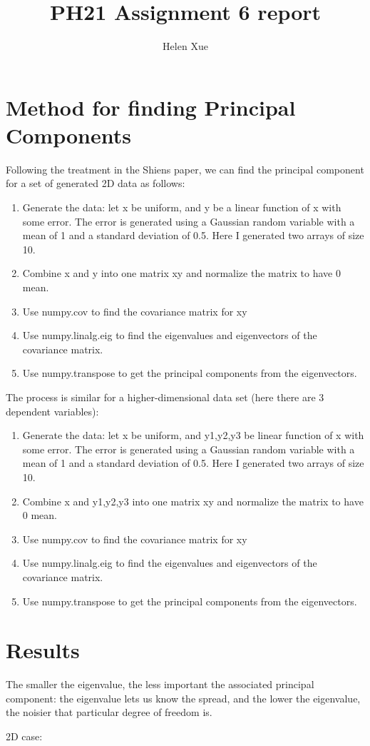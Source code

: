 \documentclass[]{scrartcl}
\title{PH21 Assignment 6 report}
\author{Helen Xue}
\begin{document}
\maketitle

\section{Method for finding Principal Components}
\par Following the treatment in the Shiens paper, we can find the principal component for a set of generated 2D data as follows:
\begin{enumerate}
	\item Generate the data: let x be uniform, and y be a linear function of x with some error. The error is generated using a Gaussian random variable with a mean of 1 and a standard deviation of 0.5. Here I generated two arrays of size 10.
	\item Combine x and y into one matrix xy and normalize the matrix to have 0 mean.
	\item Use numpy.cov to find the covariance matrix for xy
	\item Use numpy.linalg.eig to find the eigenvalues and eigenvectors of the covariance matrix.
	\item Use numpy.transpose to get the principal components from the eigenvectors. 	
\end{enumerate}

\par The process is similar for a higher-dimensional data set (here there are 3 dependent variables):
\begin{enumerate}
	\item Generate the data: let x be uniform, and y1,y2,y3 be linear function of x with some error. The error is generated using a Gaussian random variable with a mean of 1 and a standard deviation of 0.5. Here I generated two arrays of size 10.
	\item Combine x and y1,y2,y3 into one matrix xy and normalize the matrix to have 0 mean.
	\item Use numpy.cov to find the covariance matrix for xy
	\item Use numpy.linalg.eig to find the eigenvalues and eigenvectors of the covariance matrix.
	\item Use numpy.transpose to get the principal components from the eigenvectors. 	
\end{enumerate}

\section{Results}
\par The smaller the eigenvalue, the less important the associated principal component: the eigenvalue lets us know the spread, and the lower the eigenvalue, the noisier that particular degree of freedom is.
\par 2D case:
\end{document}
